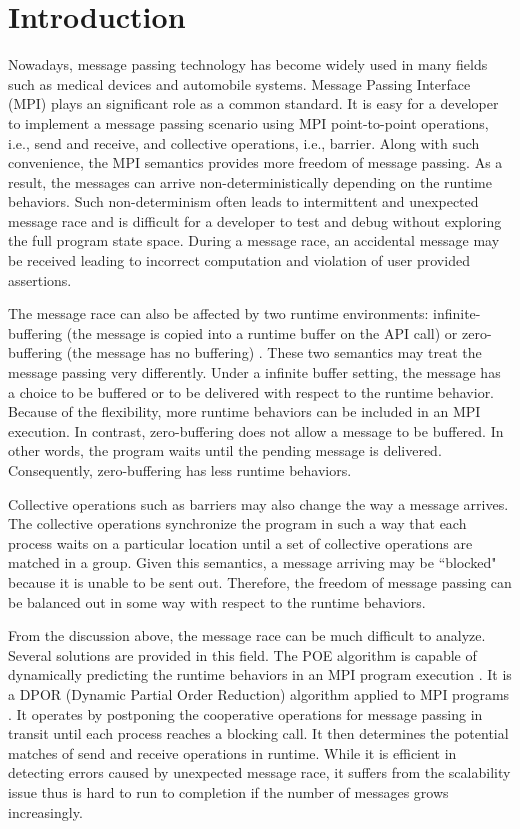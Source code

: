 \section{Introduction}
Nowadays, message passing technology has become widely used in many fields such as medical devices and automobile systems. Message Passing Interface (MPI) plays an significant role as a common standard. It is easy for a developer to implement a message passing scenario using MPI point-to-point operations, i.e., send and receive, and collective operations, i.e., barrier. Along with such convenience, the MPI semantics provides more freedom of message passing. As a result, the messages can arrive non-deterministically depending on the runtime behaviors. Such non-determinism often leads to intermittent and unexpected message race and is difficult for a developer to test and debug without exploring the full program state space. During a message race, an accidental message may be received leading to incorrect computation and violation of user provided assertions. 

The message race can also be affected by two runtime environments: infinite-buffering (the message is copied into a runtime buffer on the API call) or zero-buffering (the message has no buffering) \cite{}. These two semantics may treat the message passing very differently. Under a infinite buffer setting, the message has a choice to be buffered or to be delivered with respect to the runtime behavior. Because of the flexibility, more runtime behaviors can be included in an MPI execution. In contrast, zero-buffering does not allow a message to be buffered. In other words, the program waits until the pending message is delivered. Consequently, zero-buffering has less runtime behaviors.

Collective operations such as barriers may also change the way a message arrives. The collective operations synchronize the program in such a way that each process waits on a particular location until a set of collective operations are matched in a group. Given this semantics, a message arriving may be ``blocked" because it is unable to be sent out. Therefore, the freedom of message passing can be balanced out in some way with respect to the runtime behaviors. 

From the discussion above, the message race can be much difficult to analyze. Several solutions are provided in this field. The POE algorithm is capable of dynamically predicting the runtime behaviors in an MPI program execution \cite{}. It is a DPOR (Dynamic Partial Order Reduction) algorithm applied to MPI programs \cite{}. It operates by postponing the cooperative operations for message passing in transit until each process reaches a blocking call. It then determines the potential matches of send and receive operations in runtime. While it is efficient in detecting errors caused by unexpected message race, it suffers from the scalability issue thus is hard to run to completion if the number of messages grows increasingly. 

